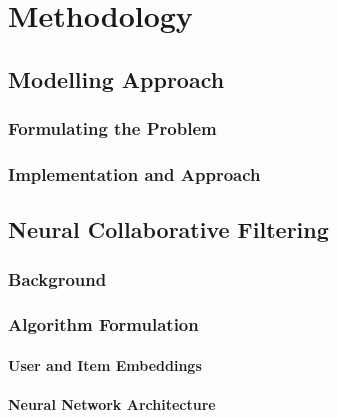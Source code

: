 
\chapter{Methodology} %
\label{Chapter4}





\section{Modelling Approach}
\label{sec:Modelling Approach}

\subsection{Formulating the Problem}
\label{subsec:Formulating the Problem}

\subsection{Implementation and Approach}
\label{subsec:Implementation and Approach}

\section{Neural Collaborative Filtering}
\label{sec:Neural Collaborative Filtering}

\subsection{Background}
\label{subsec:Background}

\subsection{Algorithm Formulation}
\label{subsec:Algorithm Formulation}

\subsubsection{User and Item Embeddings}
\label{subsubsec:User and Item Embeddings}

\subsubsection{Neural Network Architecture}
\label{subsubsec:Neural Network Architecture}

